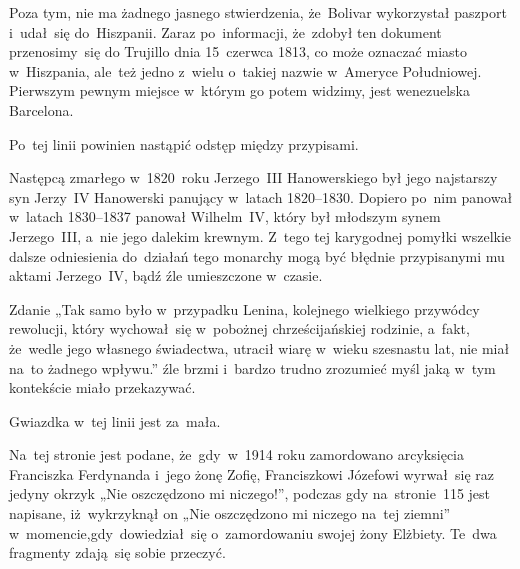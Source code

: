 \documentclass[a4paper,11pt]{article}
\begin{document}
Poza tym, nie ma żadnego jasnego stwierdzenia, że~Bolivar wykorzystał
paszport i~udał~się do~Hiszpanii. Zaraz po~informacji, że~zdobył ten
dokument przenosimy~się do Trujillo dnia 15~czerwca 1813, co może
oznaczać miasto w~Hiszpania, ale~też jedno z~wielu o~takiej nazwie
w~Ameryce Południowej. Pierwszym pewnym miejsce w~którym go potem
widzimy, jest wenezuelska Barcelona.

\vspace{\spaceFour}





\noindent
{} Po~tej linii powinien nastąpić odstęp między przypisami.

\vspace{\spaceFour}





\noindent
{} Następcą zmarłego w~1820~roku Jerzego~III Hanowerskiego był jego
najstarszy syn Jerzy~IV Hanowerski panujący w~latach 1820--1830. Dopiero
po~nim panował w~latach 1830--1837 panował Wilhelm~IV, który był młodszym
synem Jerzego~III, a~nie jego dalekim krewnym. Z~tego tej karygodnej
pomyłki wszelkie dalsze odniesienia do~działań tego monarchy mogą być
błędnie przypisanymi mu aktami Jerzego~IV, bądź źle umieszczone w~czasie.

\vspace{\spaceFour}





\noindent
{} Zdanie „Tak samo było w~przypadku Lenina, kolejnego
wielkiego przywódcy rewolucji, który wychował~się w~pobożnej
chrześcijańskiej rodzinie, a~fakt, że~wedle jego własnego świadectwa,
utracił wiarę w~wieku szesnastu lat, nie miał na~to żadnego wpływu.”
źle brzmi i~bardzo trudno zrozumieć myśl jaką w~tym kontekście miało
przekazywać.

\vspace{\spaceFour}





\noindent
{} Gwiazdka w~tej linii jest za~mała.

\vspace{\spaceFour}





\noindent
{} Na~tej stronie jest podane, że~gdy~w~1914 roku zamordowano
arcyksięcia Franciszka Ferdynanda i~jego żonę Zofię, Franciszkowi Józefowi
wyrwał~się raz jedyny okrzyk „Nie oszczędzono mi niczego!”, podczas gdy
na~stronie~115 jest napisane, iż~wykrzyknął on „Nie oszczędzono mi niczego
na~tej ziemni” w~momencie,gdy~dowiedział~się o~zamordowaniu swojej żony
Elżbiety. Te~dwa fragmenty zdają~się sobie przeczyć.
\end{document}
